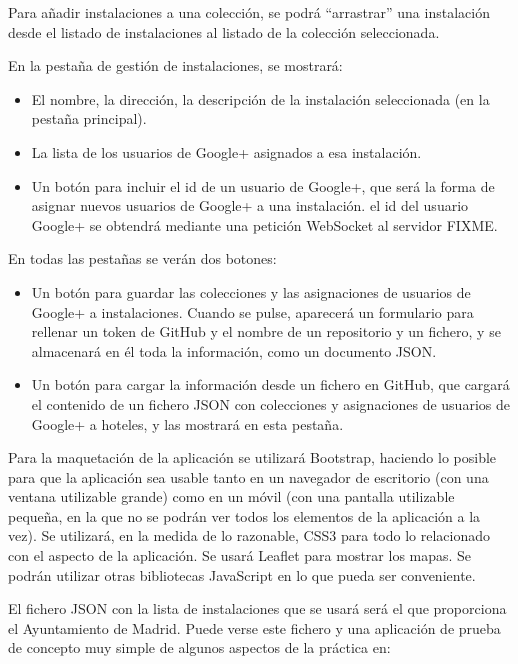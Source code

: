 Para añadir instalaciones a una colección, se podrá ``arrastrar'' una instalación desde el listado de instalaciones al listado de la colección seleccionada.

En la pestaña de gestión de instalaciones, se mostrará:

\begin{itemize}
  \item El nombre, la dirección, la descripción de la instalación seleccionada (en la pestaña principal).
  \item La lista de los usuarios de Google+ asignados a esa instalación.
  \item Un botón para incluir el id de un usuario de Google+, que será la forma de asignar nuevos usuarios de Google+ a una instalación. el id del usuario Google+ se obtendrá mediante una petición WebSocket al servidor FIXME.
\end{itemize}

En todas las pestañas se verán dos botones:

\begin{itemize}
  \item Un botón para guardar las colecciones y las asignaciones de usuarios de Google+ a instalaciones. Cuando se pulse, aparecerá un formulario para rellenar un token de GitHub y el nombre de un repositorio y un fichero, y se almacenará en él toda la información, como un documento JSON.
  \item Un botón para cargar la información desde un fichero en GitHub, que cargará el contenido de un fichero JSON con colecciones y asignaciones de usuarios de Google+ a hoteles, y las mostrará en esta pestaña.
\end{itemize}

Para la maquetación de la aplicación se utilizará Bootstrap, haciendo lo posible para que la aplicación sea usable tanto en un navegador de escritorio (con una ventana utilizable grande) como en un móvil (con una pantalla utilizable pequeña, en la que no se podrán ver todos los elementos de la aplicación a la vez). Se utilizará, en la medida de lo razonable, CSS3 para todo lo relacionado con el aspecto de la aplicación. Se usará Leaflet para mostrar los mapas. Se podrán utilizar otras bibliotecas JavaScript en lo que pueda ser conveniente.

El fichero JSON con la lista de instalaciones que se usará será el que proporciona el Ayuntamiento de Madrid. Puede verse este fichero y una aplicación de prueba de concepto muy simple de algunos aspectos de la práctica en:

